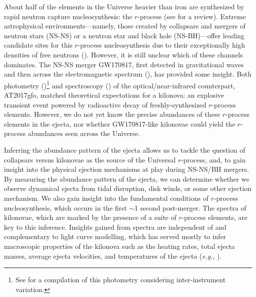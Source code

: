 \documentclass[twocolumn,twocolappendix]{aastex63}
\def\eg{{\it e.g.}}
\begin{document}
About half of the elements in the Universe heavier than iron are synthesized by rapid neutron capture nucleosynthesis: the $r$-process (see \citealt{cowan21} for a review). Extreme astrophysical environments---namely, those created by collapsars and mergers of neutron stars (NS-NS) or a neutron star and black hole (NS-BH)---offer leading candidate sites for this $r$-process nucleosynthesis due to their exceptionally high densities of free neutrons (\citealt{lattimer74, symbalisty82, eichler89, freiburghaus99, goriely11, korobkin12, bauswein13}). However, it is still unclear which of these channels dominates. The NS-NS merger GW170817, first detected in gravitational waves and then across the electromagnetic spectrum (\citealt{abbottLIGO17a, abbottLIGO17b}), has provided some insight. Both photometry (\citealt{andreoni17, arcavi17, coulter17, diaz17, drout17, evans17, hu17, kasliwal17, lipunov17, tanvir17, troja17, utsumi17, valenti17})\footnote{See \cite{villar17} for a compilation of this photometry considering inter-instrument variation.} and spectroscopy (\citealt{chornock17, kasen17, pian17, shappee17, smartt17}) of the optical/near-infrared counterpart, AT2017gfo, matched theoretical expectations for a kilonova: an explosive transient event powered by radioactive decay of freshly-synthesized $r$-process elements. However, we do not yet know the precise abundances of these $r$-process elements in the ejecta, nor whether GW170817-like kilonovae could yield the $r$-process abundances seen across the Universe. 

Inferring the abundance pattern of the ejecta allows us to tackle the question of collapsars versus kilonovae as the source of the Universal $r$-process, and, to gain insight into the physical ejection mechanisms at play during NS-NS/BH mergers. By measuring the abundance pattern of the ejecta, we can determine whether we observe dynamical ejecta from tidal disruption, disk winds, or some other ejection mechanism. We also gain insight into the fundamental conditions of $r$-process nucleosynthesis, which occurs in the first $\sim$1 second post-merger. The spectra of kilonovae, which are marked by the presence of a suite of $r$-process elements, are key to this inference. Insights gained from spectra are independent of and complementary to light curve modelling, which has served mostly to infer macroscopic properties of the kilonova such as the heating rates, total ejecta masses, average ejecta velocities, and temperatures of the ejecta (\eg, \citealt{villar17, almualla21, breschi21, ristic22}).
\end{document}
